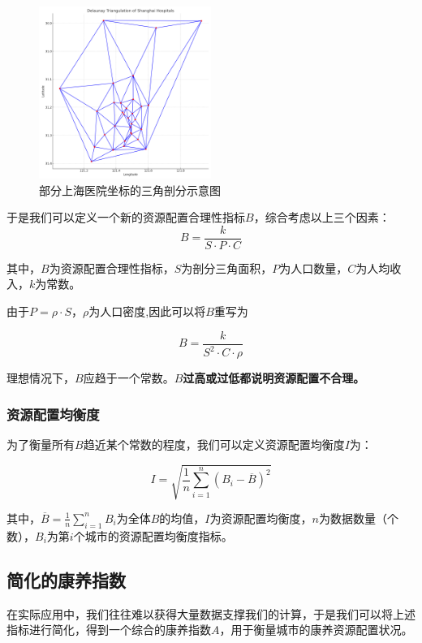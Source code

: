 \documentclass[12pt,a4paper]{article}
\begin{document}
\begin{multicols}{2}
\begin{figure}[H] %
\centering %
\includegraphics[width=0.5\textwidth]{images/delaunay_triangulation_shanghai.png} %
\caption{部分上海医院坐标的三角剖分示意图} %
\label{Fig.main2} %
\end{figure}

于是我们可以定义一个新的资源配置合理性指标$B$，综合考虑以上三个因素：
\[
B = \frac{k}{S\cdot P \cdot C}
\]

其中，$B$为资源配置合理性指标，$S$为剖分三角面积，$P$为人口数量，$C$为人均收入，$k$为常数。

由于$P=\rho \cdot S$，$\rho$为人口密度,因此可以将$B$重写为

\[
B = \frac{k}{S^2 \cdot C \cdot \rho}
\]

理想情况下，$B$应趋于一个常数。\textbf{$B$过高或过低都说明资源配置不合理。}

\subsubsection{资源配置均衡度}

为了衡量所有$B$趋近某个常数的程度，我们可以定义资源配置均衡度$I$为：

\[
I = \sqrt{\frac{1}{n} \sum_{i=1}^{n}(B_i - \overline{B})^2}
\]

其中，$\overline{B} = \frac{1}{n} \sum_{i=1}^{n}B_i$为全体$B$的均值，$I$为资源配置均衡度，$n$为数据数量（个数），$B_i$为第$i$个城市的资源配置均衡度指标。

\subsection{简化的康养指数}

在实际应用中，我们往往难以获得大量数据支撑我们的计算，于是我们可以将上述指标进行简化，得到一个综合的康养指数$A$，用于衡量城市的康养资源配置状况。


\end{multicols}
\end{document}
